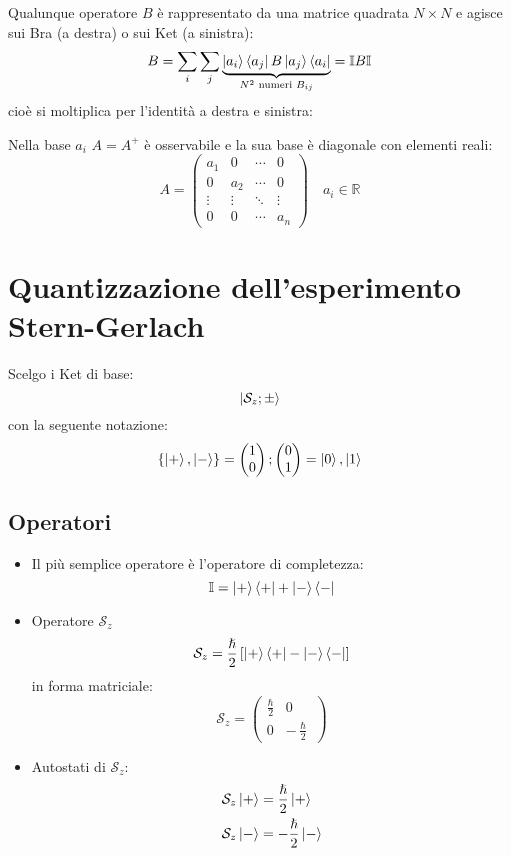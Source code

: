\documentclass[a4paper]{article}
\begin{document}
\vspace{1em}
\noindent
Qualunque operatore \( B \) è rappresentato da una matrice quadrata \( N \times N \) e
agisce sui Bra (a destra) o sui Ket (a sinistra):
\[
  B = \sum_i \sum_j \underbrace{\ket{a_i} \bra{a_j} B \ket{a_j} \bra{a_i}}_{
    N^2 \text{ numeri } B_{ij}
  } = \mathbb{I} B \mathbb{I}
\] 
cioè si moltiplica per l'identità a destra e sinistra:

\vspace{1em}
\noindent
Nella base \( a_i \) \( A = A^+ \) è osservabile e la sua base è diagonale con elementi reali:
\[
  A = 
  \begin{pmatrix} 
    a_1 & 0 & \cdots & 0\\
    0 & a_2 & \cdots & 0\\
    \vdots & \vdots & \ddots & \vdots\\
    0 & 0 & \cdots & a_n
  \end{pmatrix}
  \quad a_i \in \mathbb{R}
\]

\section{Quantizzazione dell'esperimento Stern-Gerlach}
Scelgo i Ket di base:
\[
  \ket{\mathcal{S}_z; \pm}
\] 
con la seguente notazione:
\[
  \{\ket{+}, \ket{-}\} =
    \begin{pmatrix} 1\\0 \end{pmatrix};
    \begin{pmatrix} 0\\1 \end{pmatrix}
  =
  \ket{0}, \ket{1}
\] 

\subsection{Operatori}
\begin{itemize}
  \item 
    Il più semplice operatore è l'operatore di completezza:
    \[
      \mathbb{I} = \ket{+} \bra{+} + \ket{-} \bra{-}
    \] 

  \item Operatore \( \mathcal{S}_z \) 
    \[
      \mathcal{S}_z = \frac{\hslash}{2} \left[ \ket{+}\bra{+} - \ket{-}\bra{-} \right]
    \]
    in forma matriciale:
    \[
      \mathcal{S}_z = 
      \begin{pmatrix} 
        \frac{\hslash}{2} & 0\\
        0 & -\frac{\hslash}{2}
      \end{pmatrix} 
    \] 

  \item Autostati di \( \mathcal{S}_z \):
    \[
      \begin{aligned}
        \mathcal{S}_z \ket{+} &= \frac{\hslash}{2} \ket{+}\\
        \mathcal{S}_z \ket{-} &= -\frac{\hslash}{2} \ket{-}
      \end{aligned}
    \] 
\end{itemize}
\end{document}
